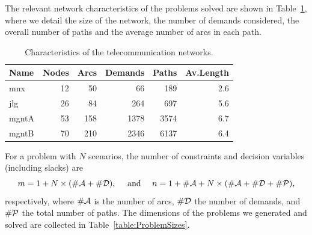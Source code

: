 The relevant network characteristics of the problems solved are shown 
in Table~\ref{table:ProblemData}, where we detail the size of the network, 
the number of demands considered, the overall number of paths and the
average number of arcs in each path.
%
%
%
\begin{table}[ht]
  \begin{center}
    \begin{tabular}{|l||r|r|r|r|r|} \hline
      Name      & Nodes & Arcs & Demands & Paths & Av.Length \\ \hline\hline
      mnx       &    12 &   50 &     66  &   189 & 2.6 \\
      jlg       &    26 &   84 &    264  &   697 & 5.6 \\
      mgntA     &    53 &  158 &   1378  &  3574 & 6.7 \\
      mgntB     &    70 &  210 &   2346  &  6137 & 6.4 \\ \hline
    \end{tabular}
    \caption{Characteristics of the telecommunication networks.}
    \label{table:ProblemData}
  \end{center} \vspace{-3ex}
\end{table}

\noindent For a problem with $N$ scenarios, the number of constraints and 
decision variables (including slacks) are
\[
m = 1 + N \times (\#{\cal A} + \#{\cal D}), \quad \mbox{ and } \quad
n = 1 + \#{\cal A} + N \times (\#{\cal A} + \#{\cal D} + \#{\cal P}),
\]
respectively, where $\#{\cal A}$ is the number of arcs, $\#{\cal D}$ 
the number of demands, and $\#{\cal P}$ the total number of paths.
The dimensions of the problems we generated and solved are
collected in Table~\ref{table:ProblemSizes}.

